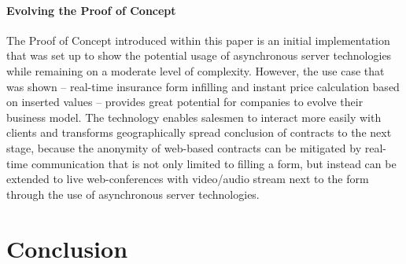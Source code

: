 \paragraph{Evolving the Proof of Concept} The Proof of Concept introduced within this paper is an initial implementation that was set up to show the potential usage of asynchronous server technologies while remaining on a moderate level of complexity. However, the use case that was shown -- real-time insurance form infilling and instant price calculation based on inserted values -- provides great potential for companies to evolve their business model. The technology enables salesmen to interact more easily with clients and transforms geographically spread conclusion of contracts to the next stage, because the anonymity of web-based contracts can be mitigated by real-time communication that is not only limited to filling a form, but instead can be extended to live web-conferences with video/audio stream next to the form through the use of asynchronous server technologies. 

%
%
%
%
%
%
%
%
%


\section{Conclusion}
\label{conclusion}



